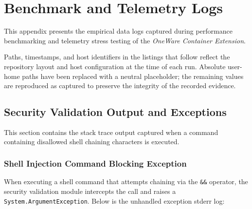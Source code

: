 % 
% 
% 

\chapter{Benchmark and Telemetry Logs}
\label{app:logs}

This appendix presents the empirical data logs captured during performance benchmarking and telemetry stress testing of the \textit{OneWare Container Extension}.

Paths, timestamps, and host identifiers in the listings that follow reflect the repository layout and host configuration at the time of each run. Absolute user-home paths have been replaced with a neutral  placeholder; the remaining values are reproduced as captured to preserve the integrity of the recorded evidence.

\section{Security Validation Output and Exceptions}
This section contains the stack trace output captured when a command containing disallowed shell chaining characters is executed.

\subsection{Shell Injection Command Blocking Exception}
When executing a shell command that attempts chaining via the \texttt{\&\&} operator, the security validation module intercepts the call and raises a \texttt{System.ArgumentException}. Below is the unhandled exception stderr log:

